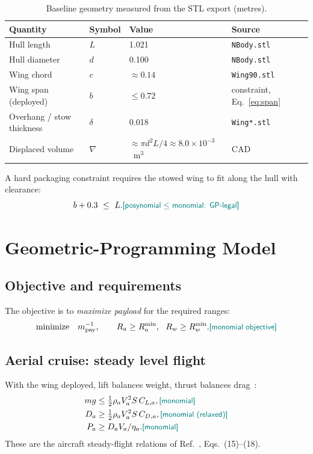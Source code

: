 \documentclass{new-aiaa}
\newcommand{\gpc}[1]{\textcolor{teal}{\small\textsf{[#1]}}} %
\begin{document}
\begin{table}[h]\centering
\caption{Baseline geometry measured from the STL export (metres).}\label{tab:geom}
\begin{tabular}{@{}llll@{}}\toprule
Quantity & Symbol & Value & Source \\\midrule
Hull length & $L$ & 1.021 & \texttt{NBody.stl} \\
Hull diameter & $d$ & 0.100 & \texttt{NBody.stl} \\
Wing chord & $c$ & $\approx0.14$ & \texttt{Wing90.stl} \\
Wing span (deployed) & $b$ & $\le0.72$ & constraint, Eq.~\eqref{eq:span} \\
Overhang / stow thickness & $\delta$ & 0.018 & \texttt{Wing*.stl} \\
Displaced volume & $\nabla$ & $\approx\!\pi d^2 L/4\approx8.0\times10^{-3}$~m$^3$ & CAD \\\bottomrule
\end{tabular}
\end{table}

A hard packaging constraint requires the stowed wing to fit along the hull with clearance:
\begin{equation}\label{eq:span}
b + 0.3\ \le\ L. \gpc{posynomial $\le$ monomial: GP-legal}
\end{equation}

\section{Geometric-Programming Model}\label{sec:gpmodel}

\subsection{Objective and requirements}
The objective is to \emph{maximize payload} for the required ranges:
\begin{equation}
\text{minimize}\quad m_{\text{pay}}^{-1},\qquad R_a\ge R_a^{\min},\ \ R_w\ge R_w^{\min}.
\gpc{monomial objective}
\end{equation}

\subsection{Aerial cruise: steady level flight}
With the wing deployed, lift balances weight, thrust balances drag~\cite{hoburg2014geometric}:
\begin{align}
m g &\le \tfrac12\rho_a V_a^2 S\,C_{L,a}, \gpc{monomial} \\
D_a &\ge \tfrac12\rho_a V_a^2 S\,C_{D,a}, \gpc{monomial (relaxed)} \\
P_a &\ge D_a V_a / \eta_a. \gpc{monomial}
\end{align}
These are the aircraft steady-flight relations of Ref.~\cite{hoburg2014geometric}, Eqs.~(15)--(18).
\end{document}
